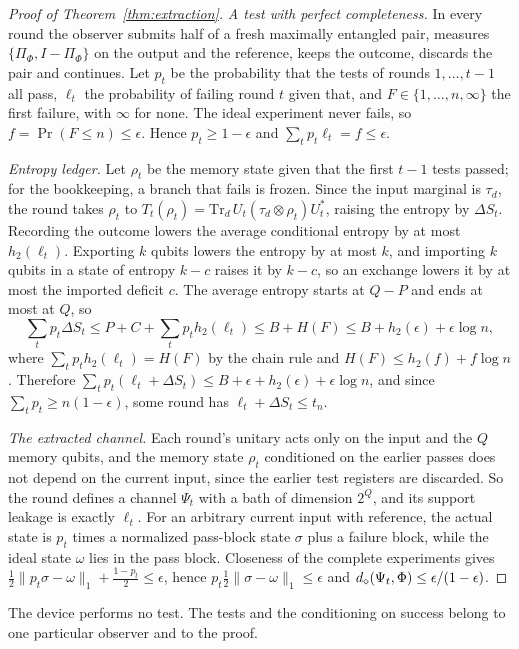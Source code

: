 \begin{proof}[Proof of Theorem~\ref{thm:extraction}]
\emph{A test with perfect completeness.} In every round the observer submits half of a fresh maximally entangled pair, measures
$\{\Pi_\Phi,I-\Pi_\Phi\}$ on the output and the reference, keeps the outcome, discards the pair and continues. Let $p_t$ be the probability that
the tests of rounds $1,\dots,t-1$ all pass, $\ell_t$ the probability of failing round $t$ given that, and $F\in\{1,\dots,n,\infty\}$ the first
failure, with $\infty$ for none. The ideal experiment never fails, so $f=\Pr(F\le n)\le\epsilon$. Hence $p_t\ge1-\epsilon$ and
$\sum_tp_t\ell_t=f\le\epsilon$.

\emph{Entropy ledger.} Let $\rho_t$ be the memory state given that the first $t-1$ tests passed; for the bookkeeping, a branch that fails is
frozen. Since the input marginal is $\tau_d$, the round takes $\rho_t$ to $T_t(\rho_t)=\mathrm{Tr}_d\,U_t(\tau_d\otimes\rho_t)U_t^*$, raising the
entropy by $\Delta S_t$. Recording the outcome lowers the average conditional entropy by at most $h_2(\ell_t)$. Exporting $k$ qubits lowers the
entropy by at most $k$, and importing $k$ qubits in a state of entropy $k-c$ raises it by $k-c$, so an exchange lowers it by at most the imported
deficit $c$. The average entropy starts at $Q-P$ and ends at most at $Q$, so
\[
\sum_tp_t\Delta S_t\le P+C+\sum_tp_th_2(\ell_t)\le B+H(F)\le B+h_2(\epsilon)+\epsilon\log n,
\]
where $\sum_tp_th_2(\ell_t)=H(F)$ by the chain rule and $H(F)\le h_2(f)+f\log n$. Therefore
$\sum_tp_t(\ell_t+\Delta S_t)\le B+\epsilon+h_2(\epsilon)+\epsilon\log n$, and since $\sum_tp_t\ge n(1-\epsilon)$, some round has
$\ell_t+\Delta S_t\le t_n$.

\emph{The extracted channel.} Each round's unitary acts only on the input and the $Q$ memory qubits, and the memory state $\rho_t$ conditioned on
the earlier passes does not depend on the current input, since the earlier test registers are discarded. So the round defines a channel $\Psi_t$
with a bath of dimension $2^Q$, and its support leakage is exactly $\ell_t$. For an arbitrary current input with reference, the actual state is
$p_t$ times a normalized pass-block state $\sigma$ plus a failure block, while the ideal state $\omega$ lies in the pass block. Closeness of the
complete experiments gives $\frac12\|p_t\sigma-\omega\|_1+\frac{1-p_t}2\le\epsilon$, hence $p_t\frac12\|\sigma-\omega\|_1\le\epsilon$ and
$d_\diamond(\Psi_t,\Phi)\le\epsilon/(1-\epsilon)$.
\end{proof}

The device performs no test. The tests and the conditioning on success belong to one particular observer and to the proof.
